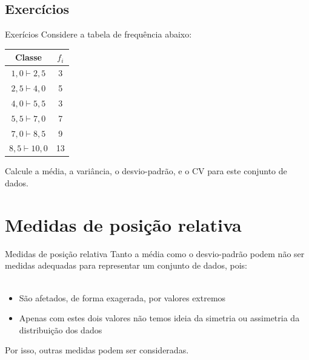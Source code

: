\documentclass[10pt]{beamer}\usepackage[]{graphicx}\usepackage[]{color}
\theoremstyle{definition}
\begin{document}
\subsection{Exercícios}

\begin{frame}{Exerícios}
  Considere a tabela de frequência abaixo:
  \begin{table}[h]
    \centering
    \begin{tabular}{cc}
      \hline
      Classe & $f_i$ \\
      \hline
      $1,0 \vdash 2,5$ & 3 \\
      $2,5 \vdash 4,0$ & 5 \\
      $4,0 \vdash 5,5$ & 3 \\
      $5,5 \vdash 7,0$ & 7 \\
      $7,0 \vdash 8,5$ & 9 \\
      $8,5 \vdash 10,0$ & 13 \\
      \hline
    \end{tabular}
  \end{table}
  Calcule a média, a variância, o desvio-padrão, e o CV para este
  conjunto de dados.
\end{frame}



\section[Medidas de posição]{Medidas de posição relativa}

\begin{frame}{Medidas de posição relativa}
  Tanto a média como o desvio-padrão podem não ser medidas adequadas
  para representar um conjunto de dados, pois: \\~\\
  \begin{itemize}
  \item São afetados, de forma exagerada, por valores extremos
  \item Apenas com estes dois valores não temos ideia da simetria ou
    assimetria da distribuição dos dados
  \end{itemize}
  \vspace{1em}
  Por isso, outras medidas podem ser consideradas.
\end{frame}
\end{document}
